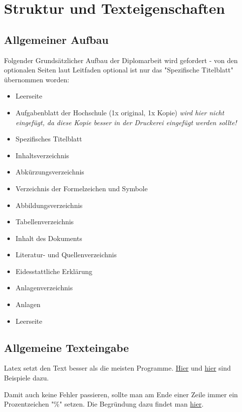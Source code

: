 \chapter{Struktur und Texteigenschaften}%
\section{Allgemeiner Aufbau}%
Folgender Grundsätzlicher Aufbau der Diplomarbeit wird gefordert - von den optionalen Seiten laut Leitfaden optional ist nur das "Spezifische Titelblatt" übernommen worden:%
\begin{itemize}%
 \item Leerseite%
 \item Aufgabenblatt der Hochschule (1x original, 1x Kopie) \emph{wird hier nicht eingefügt, da diese Kopie besser in der Druckerei eingefügt werden sollte!}%
 \item Spezifisches Titelblatt%
 \item Inhaltsverzeichnis%
 \item Abkürzungsverzeichnis%
 \item Verzeichnis der Formelzeichen und Symbole%
 \item Abbildungsverzeichnis%
 \item Tabellenverzeichnis%
 \item Inhalt des Dokuments%
 \item Literatur- und Quellenverzeichnis%
 \item Eidesstattliche Erklärung%
 \item Anlagenverzeichnis%
 \item Anlagen%
 \item Leerseite%
\end{itemize}%
%
%
\section{Allgemeine Texteingabe}%
Latex setzt den Text besser als die meisten Programme. \href{https://tex.stackexchange.com/questions/110133/visual-comparison-between-latex-and-word-output-hyphenation-typesetting-ligat#110140}{Hier} und \href{http://www.rtznet.nl/zink/latex.php}{hier} sind Beispiele dazu.%

Damit auch keine Fehler passieren, sollte man am Ende einer Zeile immer ein Prozentzeichen "\%" setzen. Die Begründung dazu findet man \href{https://tex.stackexchange.com/questions/7453/what-is-the-use-of-percent-signs-at-the-end-of-lines#7459}{hier}.%

